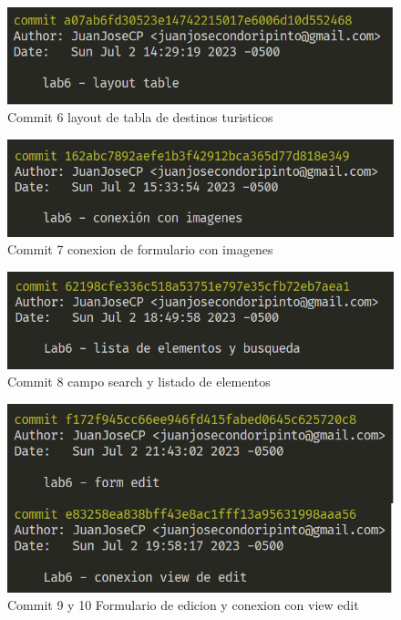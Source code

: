 \documentclass{article}
\begin{document}
    \begin{figure}
        \centering
        \includegraphics[width=150mm]{img/commit5.png}
        \caption{Commit 6 layout de tabla de destinos turisticos}
        \label{fig:enter-label}
    \end{figure}
    \begin{figure}
        \centering
        \includegraphics[width=150mm]{img/commit7.png}
        \caption{Commit 7 conexion de formulario con imagenes}
        \label{fig:enter-label}
    \end{figure}
    \begin{figure}
        \centering
        \includegraphics[width=150mm]{img/commit8.png}
        \caption{Commit 8 campo search y listado de elementos}
        \label{fig:enter-label}
    \end{figure}
    \begin{figure}
        \centering
        \includegraphics[width=150mm]{img/commit9.png}
        \caption{Commit 9 y 10 Formulario de edicion y conexion con view edit}
        \label{fig:enter-label}
    \end{figure}
\end{document}
